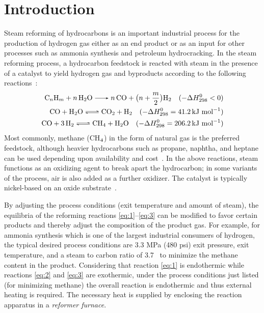 \chapter{Introduction} \label{ch:introduction}

Steam reforming of hydrocarbons is an important industrial process for the production of hydrogen gas either as an end product or as an input for other processes such as ammonia synthesis and petroleum hydrocracking. In the steam reforming process, a hydrocarbon feedstock is reacted with steam in the presence of a catalyst to yield hydrogen gas and byproducts according to the following reactions~\cite{rostrup-nielsen_catalytic_1984}:
\begin{align}
\ce{C_{n}H_{m} + n H2O -> n CO + } \bigl(n + \frac{m}{2}\bigr) \ce{H2} \quad (-\Delta{}H^{0}_{298} < 0) \label{eq:1} \\
\ce{CO + H2O <=> CO2 + H2} \quad (-\Delta{}H^{0}_{298} = 41.2 \, \text{kJ mol}^{-1}) \label{eq:2} \\
\ce{CO + 3H2 <=> CH4 + H2O} \quad (-\Delta{}H^{0}_{298} = 206.2 \, \text{kJ mol}^{-1}) \label{eq:3}
\end{align}
Most commonly, methane (CH$_{\textnormal{4}}$) in the form of natural gas is the preferred feedstock, although heavier hydrocarbons such as propane, naphtha, and heptane can be used depending upon availability and cost~\cite{rostrup-nielsen_catalytic_1984,haussinger_hydrogen_2000}. In the above reactions, steam functions as an oxidizing agent to break apart the hydrocarbon; in some variants of the process, air is also added as a further oxidizer. The catalyst is typically nickel-based on an oxide substrate~\cite{rostrup-nielsen_catalytic_1984}.

By adjusting the process conditions (exit temperature and amount of steam), the equilibria of the reforming reactions \ref{eq:1}--\ref{eq:3} can be modified to favor certain products and thereby adjust the composition of the product gas. For example, for ammonia synthesis which is one of the largest industrial consumers of hydrogen, the typical desired process conditions are 3.3 MPa (480 psi) exit pressure,  exit temperature, and a steam to carbon ratio of 3.7~\cite{rostrup-nielsen_catalytic_1984} to minimize the methane content in the product. Considering that reaction \ref{eq:1} is endothermic while reactions \ref{eq:2} and \ref{eq:3} are exothermic, under the process conditions just listed (for minimizing methane) the overall reaction is endothermic and thus external heating is required. The necessary heat is supplied by enclosing the reaction apparatus in a \emph{reformer furnace}.

